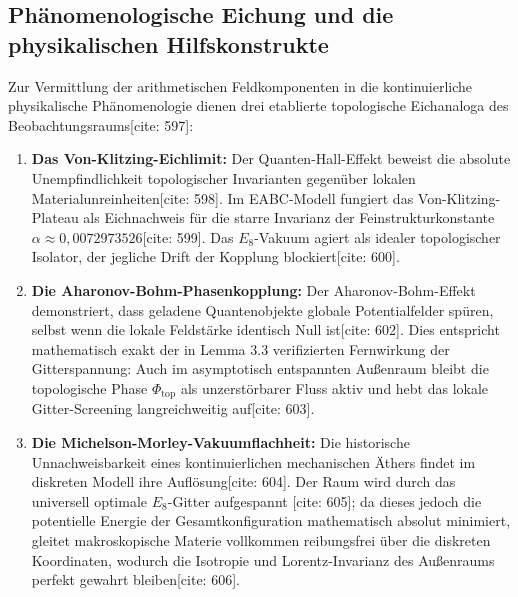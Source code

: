 \documentclass[11pt,a4paper]{article}
\newcommand{\Eoct}{E_8}
\theoremstyle{definition}
\begin{document}
	\subsection{Phänomenologische Eichung und die physikalischen Hilfskonstrukte}
	Zur Vermittlung der arithmetischen Feldkomponenten in die kontinuierliche physikalische Phänomenologie dienen drei etablierte topologische Eichanaloga des Beobachtungsraums[cite: 597]:
	\begin{enumerate}
		\item \textbf{Das Von-Klitzing-Eichlimit:} Der Quanten-Hall-Effekt beweist die absolute Unempfindlichkeit topologischer Invarianten gegenüber lokalen Materialunreinheiten[cite: 598]. Im EABC-Modell fungiert das Von-Klitzing-Plateau als Eichnachweis für die starre Invarianz der Feinstrukturkonstante $\alpha \approx 0{,}0072973526$[cite: 599]. Das $\Eoct$-Vakuum agiert als idealer topologischer Isolator, der jegliche Drift der Kopplung blockiert[cite: 600].
		\item \textbf{Die Aharonov-Bohm-Phasenkopplung:} Der Aharonov-Bohm-Effekt demonstriert, dass geladene Quantenobjekte globale Potentialfelder spüren, selbst wenn die lokale Feldstärke identisch Null ist[cite: 602]. Dies entspricht mathematisch exakt der in Lemma 3.3 verifizierten Fernwirkung der Gitterspannung: Auch im asymptotisch entspannten Außenraum bleibt die topologische Phase $\Phi_{\text{top}}$ als unzerstörbarer Fluss aktiv und hebt das lokale Gitter-Screening langreichweitig auf[cite: 603].
		\item \textbf{Die Michelson-Morley-Vakuumflachheit:} Die historische Unnachweisbarkeit eines kontinuierlichen mechanischen Äthers findet im diskreten Modell ihre Auflösung[cite: 604]. Der Raum wird durch das universell optimale $\Eoct$-Gitter aufgespannt [cite: 605]; da dieses jedoch die potentielle Energie der Gesamtkonfiguration mathematisch absolut minimiert, gleitet makroskopische Materie vollkommen reibungsfrei über die diskreten Koordinaten, wodurch die Isotropie und Lorentz-Invarianz des Außenraums perfekt gewahrt bleiben[cite: 606].
	\end{enumerate}
	
\end{document}
